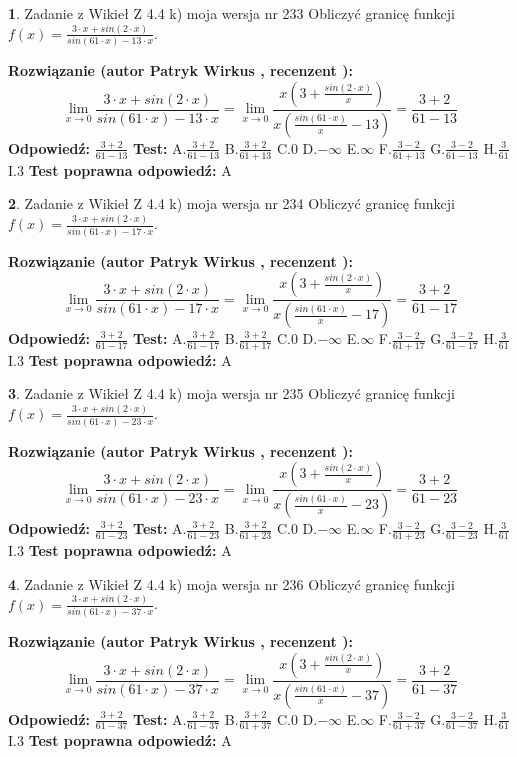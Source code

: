 \documentclass[12pt, a4paper]{article}
\theoremstyle{definition} %
\newtheorem{zad}{}
\newcommand{\zadStart}[1]{\begin{zad}#1\newline}
\newcommand{\zadStop}{\end{zad}}
\newcommand{\rozwStart}[2]{\noindent \textbf{Rozwiązanie (autor #1 , recenzent #2): }\newline}
\newcommand{\rozwStop}{\newline}
\newcommand{\odpStart}{\noindent \textbf{Odpowiedź:}\newline}
\newcommand{\odpStop}{\newline}
\newcommand{\testStart}{\noindent \textbf{Test:}\newline}
\newcommand{\testStop}{\newline}
\newcommand{\kluczStart}{\noindent \textbf{Test poprawna odpowiedź:}\newline}
\newcommand{\kluczStop}{\newline}
\begin{document}
\zadStart{Zadanie z Wikieł Z 4.4 k) moja wersja nr 233}
Obliczyć granicę funkcji $f(x)=\frac{3\cdot x +sin(2\cdot x)}{sin(61\cdot x) -13\cdot x}$.
\zadStop
\rozwStart{Patryk Wirkus}{}
$$\lim\limits_{x\to 0}\frac{3\cdot x +sin(2\cdot x)}{sin(61\cdot x) -13\cdot x}
=\lim\limits_{x\to 0}\frac{x(3+\frac{sin(2\cdot x)}{x})}{x(\frac{sin(61\cdot x)}{x}-13)}
=\frac{3+2}{61-13}$$
\rozwStop
\odpStart
$\frac{3+2}{61-13}$
\odpStop
\testStart
A.$\frac{3+2}{61-13}$
B.$\frac{3+2}{61+13}$
C.$0$
D.$-\infty$
E.$\infty$
F.$\frac{3-2}{61+13}$
G.$\frac{3-2}{61-13}$
H.$\frac{3}{61}$
I.$3$
\testStop
\kluczStart
A
\kluczStop



\zadStart{Zadanie z Wikieł Z 4.4 k) moja wersja nr 234}
Obliczyć granicę funkcji $f(x)=\frac{3\cdot x +sin(2\cdot x)}{sin(61\cdot x) -17\cdot x}$.
\zadStop
\rozwStart{Patryk Wirkus}{}
$$\lim\limits_{x\to 0}\frac{3\cdot x +sin(2\cdot x)}{sin(61\cdot x) -17\cdot x}
=\lim\limits_{x\to 0}\frac{x(3+\frac{sin(2\cdot x)}{x})}{x(\frac{sin(61\cdot x)}{x}-17)}
=\frac{3+2}{61-17}$$
\rozwStop
\odpStart
$\frac{3+2}{61-17}$
\odpStop
\testStart
A.$\frac{3+2}{61-17}$
B.$\frac{3+2}{61+17}$
C.$0$
D.$-\infty$
E.$\infty$
F.$\frac{3-2}{61+17}$
G.$\frac{3-2}{61-17}$
H.$\frac{3}{61}$
I.$3$
\testStop
\kluczStart
A
\kluczStop



\zadStart{Zadanie z Wikieł Z 4.4 k) moja wersja nr 235}
Obliczyć granicę funkcji $f(x)=\frac{3\cdot x +sin(2\cdot x)}{sin(61\cdot x) -23\cdot x}$.
\zadStop
\rozwStart{Patryk Wirkus}{}
$$\lim\limits_{x\to 0}\frac{3\cdot x +sin(2\cdot x)}{sin(61\cdot x) -23\cdot x}
=\lim\limits_{x\to 0}\frac{x(3+\frac{sin(2\cdot x)}{x})}{x(\frac{sin(61\cdot x)}{x}-23)}
=\frac{3+2}{61-23}$$
\rozwStop
\odpStart
$\frac{3+2}{61-23}$
\odpStop
\testStart
A.$\frac{3+2}{61-23}$
B.$\frac{3+2}{61+23}$
C.$0$
D.$-\infty$
E.$\infty$
F.$\frac{3-2}{61+23}$
G.$\frac{3-2}{61-23}$
H.$\frac{3}{61}$
I.$3$
\testStop
\kluczStart
A
\kluczStop



\zadStart{Zadanie z Wikieł Z 4.4 k) moja wersja nr 236}
Obliczyć granicę funkcji $f(x)=\frac{3\cdot x +sin(2\cdot x)}{sin(61\cdot x) -37\cdot x}$.
\zadStop
\rozwStart{Patryk Wirkus}{}
$$\lim\limits_{x\to 0}\frac{3\cdot x +sin(2\cdot x)}{sin(61\cdot x) -37\cdot x}
=\lim\limits_{x\to 0}\frac{x(3+\frac{sin(2\cdot x)}{x})}{x(\frac{sin(61\cdot x)}{x}-37)}
=\frac{3+2}{61-37}$$
\rozwStop
\odpStart
$\frac{3+2}{61-37}$
\odpStop
\testStart
A.$\frac{3+2}{61-37}$
B.$\frac{3+2}{61+37}$
C.$0$
D.$-\infty$
E.$\infty$
F.$\frac{3-2}{61+37}$
G.$\frac{3-2}{61-37}$
H.$\frac{3}{61}$
I.$3$
\testStop
\kluczStart
A
\kluczStop
\end{document}
